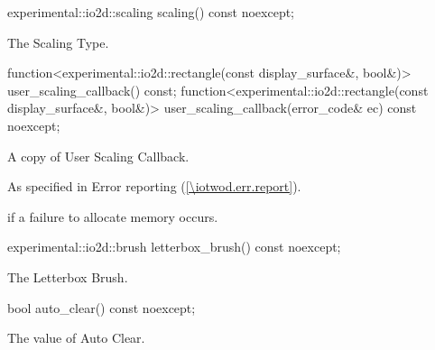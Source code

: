 \begin{itemdecl}
experimental::io2d::scaling scaling() const noexcept;
\end{itemdecl}
\begin{itemdescr}
\pnum
\returns
The Scaling Type.
\end{itemdescr}

\begin{itemdecl}
function<experimental::io2d::rectangle(const display_surface&, bool&)>
  user_scaling_callback() const;
function<experimental::io2d::rectangle(const display_surface&, bool&)>
  user_scaling_callback(error_code& ec) const noexcept;
\end{itemdecl}
\begin{itemdescr}
\pnum
\returns
A copy of User Scaling Callback.

\pnum
\throws
As specified in Error reporting (\ref{\iotwod.err.report}).

\pnum
\errors
{} if a failure to allocate memory occurs.
\end{itemdescr}

\begin{itemdecl}
experimental::io2d::brush letterbox_brush() const noexcept;
\end{itemdecl}
\begin{itemdescr}
\pnum
\returns
The Letterbox Brush.
\end{itemdescr}

\begin{itemdecl}
bool auto_clear() const noexcept;
\end{itemdecl}
\begin{itemdescr}
\pnum
\returns
The value of Auto Clear.
\end{itemdescr}
